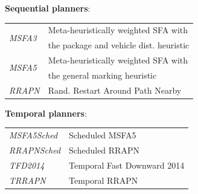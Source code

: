 \documentclass[a1paper,landscape,fontscale=0.45]{baposter} %
\begin{document}
\begin{poster}
{\textbf{Sequential planners}:

{
\setlength{\tabcolsep}{3pt} %
\renewcommand{\arraystretch}{1} %
\begin{tabular}{ll}
\multirow{2}{*}{\textit{MSFA3}} & Meta-heuristically weighted SFA with\\
& the package and vehicle dist. heuristic\\[4pt]
\multirow{2}{*}{\textit{MSFA5}} & Meta-heuristically weighted SFA with\\
& the general marking heuristic\\[4pt]
\textit{RRAPN} & Rand. Restart Around Path Nearby
\end{tabular}

\vspace{0.1cm}
\textbf{Temporal planners}:
\vspace{0.05cm}

{
\setlength{\tabcolsep}{3pt} %
\renewcommand{\arraystretch}{1} %
\begin{tabular}{ll}
\textit{MSFA5Sched} & Scheduled MSFA5\\[2pt]
\textit{RRAPNSched} & Scheduled RRAPN\\[2pt]
\textit{TFD2014} & Temporal Fast Downward 2014\\[2pt]
\textit{TRRAPN} & Temporal RRAPN
\end{tabular}
}
}
}




\end{poster}
\end{document}
